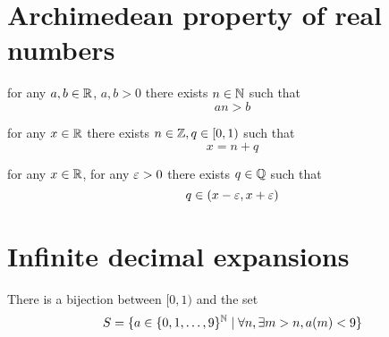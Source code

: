 \section{Archimedean property of real numbers}
\begin{theorem}
  for any $a,b \in \mathbb R$, $a, b > 0$ there exists $n \in \mathbb N$ such that 
  \[an > b\]
\end{theorem}

\begin{theorem}
  for any $x \in \mathbb R$ there exists $n \in \mathbb Z, q \in [0, 1)$ such that 
  \[x = n + q\]
\end{theorem}

\begin{theorem}[$\QQ$ dense in $\RR$]
  for any $x \in \mathbb R$, for any $\varepsilon > 0$ there exists $q \in \mathbb Q$ such that
  \[q \in (x - \varepsilon, x + \varepsilon)\]
\end{theorem}

\section{Infinite decimal expansions}

\begin{definition}
  There is a bijection between $[0, 1)$ and the set
  \[
    S = \{a \in \{0, 1, \dotsc, 9\}^{\mathbb N} \mid \forall n, \exists m > n, a(m) < 9\}
  \]
\end{definition}